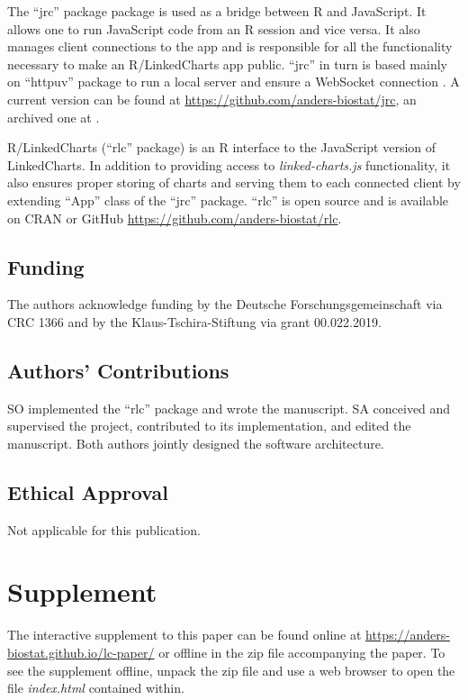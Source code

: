 \documentclass[twocolumn,10pt]{article}
\begin{document}
The ``jrc'' package package is used as a bridge between R and JavaScript. It allows one to run JavaScript code from an R session and vice versa. It also manages client connections to the app and is responsible for all the functionality necessary to make an R/LinkedCharts app public. ``jrc'' in turn is based mainly on ``httpuv'' \citep{cheng_2020} package to run a local server and ensure a WebSocket connection \citep{fette_rfc_2011}. A current version can be found at \url{https://github.com/anders-biostat/jrc}, an archived one at \cite{jrc_2020}.

R/LinkedCharts (``rlc'' package) is an R \citep{R_2019} interface to the JavaScript version of LinkedCharts. In addition to providing access to \emph{linked-charts.js} functionality, it also ensures proper storing of charts and serving them to each connected client by extending ``App'' class of the ``jrc'' package. ``rlc'' is open source and is available on CRAN or GitHub \url{https://github.com/anders-biostat/rlc}.

\subsection{Funding}

The authors acknowledge funding by the Deutsche Forschungsgemeinschaft via CRC 1366 and by the Klaus-Tschira-Stiftung via grant 00.022.2019.

\subsection{Authors’ Contributions}
SO implemented the ``rlc'' package and wrote the manuscript. SA conceived and supervised the project, contributed to its implementation, and edited the manuscript. Both authors jointly designed the software architecture.

\subsection{Ethical Approval}
Not applicable for this publication.

\section{Supplement}

The interactive supplement to this paper can be found online at \url{https://anders-biostat.github.io/lc-paper/} or offline in the zip file accompanying the paper. To see the supplement offline, unpack the zip file and use a web browser to open the file \emph{index.html} contained within.

\begin{small}

\end{small}
\end{document}
